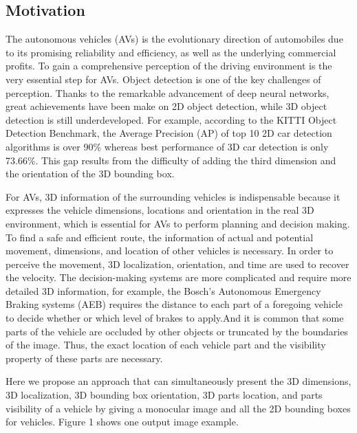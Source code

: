 \subsection{Motivation}
The autonomous vehicles (AVs) is the evolutionary direction of automobiles  due to its promising reliability and efficiency, as well as the underlying commercial profits. To gain a comprehensive perception of the driving environment is the very essential step for AVs. Object detection is one of the key challenges of perception. Thanks to the remarkable advancement of deep neural networks, great achievements have been make on 2D object detection, while 3D object detection is still underdeveloped. For example, according to the  KITTI Object Detection Benchmark\cite{Geiger2012CVPR}, the Average Precision (AP) of  top 10 2D car detection algorithms is over 90\% whereas best performance of 3D car detection is only 73.66\%. This gap results from the difficulty of adding the third dimension and the orientation of the 3D bounding box.

For AVs, 3D information of the surrounding vehicles is indispensable because it expresses the vehicle dimensions, locations and orientation in the real 3D environment, which is essential for AVs to perform planning and decision making. To find a safe and efficient route, the information of actual and potential movement, dimensions, and location of other vehicles is necessary. In order to perceive the movement, 3D localization,  orientation, and time are used to recover the velocity. The decision-making systems are more complicated and require more detailed 3D information, for example, the Bosch's Autonomous Emergency Braking systems (AEB) requires the distance to each part of a foregoing vehicle to decide whether or which level of brakes to apply.And it is common that some parts of the vehicle are occluded by other objects or truncated by the boundaries of the image. Thus, the exact location of each vehicle part and the visibility property of these parts are necessary.

Here we propose an approach that can simultaneously present the 3D dimensions, 3D localization, 3D bounding box orientation, 3D parts location, and parts visibility of a vehicle by giving a monocular image and all the 2D bounding boxes for vehicles. Figure 1 \tbd shows one output image example.


